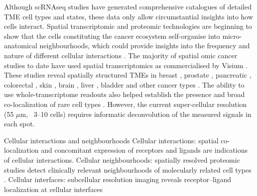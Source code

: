 Although \ac{scRNAseq} studies have generated comprehensive catalogues of detailed TME cell types and states, these data only allow circumstantial insights into how cells interact. Spatial transcriptomic and proteomic technologies are beginning to show that the cells constituting the cancer ecosystem self-organise into micro-anatomical neighbourhoods, which could provide insights into the frequency and nature of different cellular interactions  . The majority of spatial omic cancer studies to date have used spatial transcriptomics as commercialised by \ac{Visium} . These studies reveal spatially structured TMEs in breast \parencite{Stahl2016-nq,Wu2021-uq,Andersson2021-pu}, prostate \parencite{Berglund2018-gh}, pancreatic \parencite{Moncada2020-ck}, colorectal \parencite{Qi2022-by}, skin \parencite{Ji2020-gn}, brain \parencite{Ravi2022-ut}, liver \parencite{Wu2021-wb}, bladder \parencite{Gouin2021-zx} and other cancer types \parencite{Erickson2022-zh,Barkley2022-gx}. The ability to use whole-transcriptome readouts also helped establish the presence and broad co-localization of rare cell types . However, the current super-cellular resolution (55 $\mu$m, ~3–10 cells) requires informatic deconvolution of the measured signals in each spot.

    {Cellular interactions and neighbourhoods \parencite{Seferbekova2023-wg}}
    {Cellular interactions: spatial co-localization and concomitant expression of receptors and ligands are indications of cellular interactions. Cellular neighbourhoods: spatially resolved proteomic studies detect clinically relevant neighbourhoods of molecularly related cell types \parencite{Danenberg2022-zb}. Cellular interfaces: subcellular resolution imaging reveals receptor–ligand localization at cellular interfaces \parencite{Nirmal2022-sq}}


